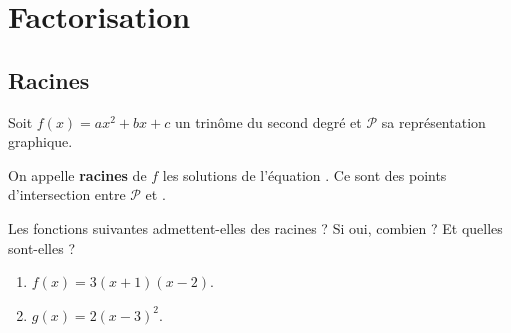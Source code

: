 \documentclass{beamer}
\begin{document}

 
 
 \section{Factorisation}
 
 \subsection{Racines}
 
 \begin{frame}
 \begin{definition}
    Soit $f(x)=ax^2+bx+c$ un trinôme du second degré et $\mathcal{P}$ sa représentation 
    graphique.
    
    On appelle \textbf{racines} de $f$ les solutions de l'équation .
    Ce sont  des points d'intersection entre $\mathcal{P}$ 
    et .
    
  \end{definition}
\end{frame}
  
  \begin{frame}
  \begin{example}
    Les fonctions suivantes admettent-elles des racines ? Si oui, combien ? 
    Et quelles sont-elles ?
    \begin{enumerate}
     \item $f(x)=3(x+1)(x-2)$. 
     \item $g(x)=2(x-3)^2$.
    \end{enumerate}
  \end{example}
\end{frame}
\end{document}
